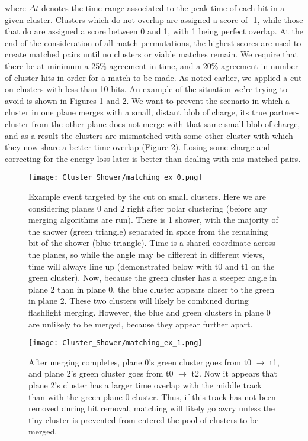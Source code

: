 \noindent where $\Delta t$ denotes the time-range associated to the peak time of each hit in a given cluster.  Clusters which do not overlap are assigned a score of -1, while those that do are assigned a score between 0 and 1, with 1 being perfect overlap. At the end of the consideration of all match permutations, the highest scores are used to create matched pairs until no clusters or viable matches remain. We require that there be at minimum a 25\% agreement in time, and a 20\% agreement in number of cluster hits in order for a match to be made. As noted earlier, we applied a cut on clusters with less than 10 hits. An example of the situation we're trying to avoid is shown in Figures \ref{fig:matching_ex_0} and \ref{fig:matching_ex_1}.  We want to prevent the scenario in which a cluster in one plane merges with a small, distant blob of charge, its true partner-cluster from the other plane does not merge with that same small blob of charge, and as a result the clusters are mismatched with some other cluster with which they now share a better time overlap (Figure \ref{fig:matching_ex_1}). Losing some charge and correcting for the energy loss later is better than dealing with mis-matched pairs.

\begin{figure}[H]
\centering
\texttt{[image: Cluster\_Shower/matching\_ex\_0.png]}
\caption{Example event targeted by the cut on small clusters. Here we are considering planes 0 and 2 right after polar clustering (before any merging algorithms are run).  There is 1 shower, with the majority of the shower (green triangle) separated in space from the remaining bit of the shower (blue triangle).  Time is a shared coordinate across the planes, so while the angle may be different in different views, time will always line up (demonstrated below with t0 and t1 on the green cluster).  Now, because the green cluster has a steeper angle in plane 2 than in plane 0, the blue cluster appears closer to the green in plane 2.  These two clusters will likely be combined during flashlight merging.  However, the blue and green clusters in plane 0 are unlikely to be merged,  because they appear further apart. }
\label{fig:matching_ex_0}
\end{figure}

\begin{figure}[H]
\centering
\texttt{[image: Cluster\_Shower/matching\_ex\_1.png]}
\caption{After merging completes, plane 0’s green cluster goes from t0 $\rightarrow$ t1, and plane 2’s green cluster goes from t0 $\rightarrow$ t2. Now it appears that plane 2’s cluster has a larger time overlap with the middle track than with the green plane 0 cluster.  Thus, if this track has not been removed during hit removal, matching will likely go awry unless the tiny cluster is prevented from entered the pool of clusters to-be-merged.
 }
\label{fig:matching_ex_1}
\end{figure}


